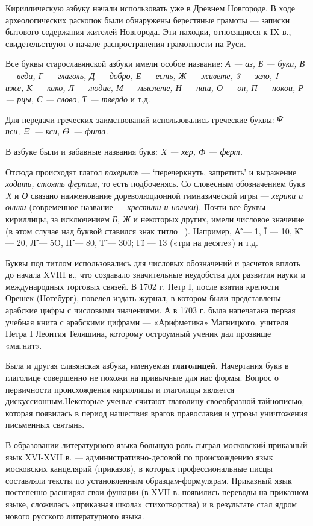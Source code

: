Кириллическую азбуку начали использовать уже в Древнем Новгороде.
В ходе археологических раскопок были обнаружены берестяные грамоты --- записки бытового содержания жителей Новгорода.
Эти находки, относящиеся к IX в., свидетельствуют о начале распространения грамотности на Руси.

Все буквы старославянской азбуки имели особое название: \textit{А --- аз, Б --- буки, В --- веди, Г --- глаголь, Д --- добро, Е --- есть, Ж --- живете, 3 --- зело, I --- иже, К --- како, Л --- людие, М --- мыслете, Н --- наш, О --- он, П --- покои, Р --- рцы, С --- слово, Т --- твердо} и т.д.

Для передачи греческих заимствований использовались греческие буквы: \textit{$\mit\Psi$ --- пси, $\mit\Xi$ --- кси, $\mit \Theta$ --- фита.}

В азбуке были и забавные названия букв: \textit{X --- хер, Ф --- ферт.}

Отсюда происходят глагол \textit{похерить} --- ‘перечеркнуть, запретить’ и выражение \textit{ходить, стоять фертом,} то есть подбоченясь.
Со словесным обозначением букв \textit{X} и \textit{О} связано наименование дореволюционной гимназической игры --- \textit{херики и оники} (современное название --- \textit{крестики и нолики}).
Почти все буквы кириллицы, за исключением \textit{Б, Ж} и некоторых других, имели числовое значение (в этом случае над буквой ставился знак титло ~). Например, \~{А} --- 1, \~{I} --- 10, \~{К} --- 20, \~{Л} --- 5O, \~{П} --- 80, \~{Т} --- 300; \~{ГI} --- 13 («три на десяте») и т.д.

Буквы под титлом использовались для числовых обозначений и расчетов вплоть до начала XVIII в., что создавало значительные неудобства для развития науки и международных торговых связей.
В 1702 г. Петр I, после взятия крепости Орешек (Нотебург), повелел издать журнал, в котором были представлены арабские цифры с числовыми значениями.
А в 1703 г. была напечатана первая учебная книга с арабскими цифрами --- «Арифметика» Магницкого, учителя Петра I Леонтия Теляшина, которому остроумный ученик дал прозвище «магнит».

Была и другая славянская азбука, именуемая \textbf{глаголицей.} Начертания букв в глаголице совершенно не похожи на привычные для нас формы.
Вопрос о первичности происхождения кириллицы и глаголицы является дискуссионным.Некоторые ученые считают глаголицу своеобразной тайнописью, которая появилась в период нашествия врагов православия и угрозы уничтожения письменных святынь.

В образовании литературного языка большую роль сыграл московский приказный язык XVI-XVII в. --- административно-деловой по происхождению язык московских канцелярий (приказов), в которых профессиональные писцы составляли тексты по установленным образцам-формулярам.
Приказный язык постепенно расширял свои функции (в XVII в. появились переводы на приказном языке, сложилась «приказная школа» стихотворства) и в результате стал ядром нового русского литературного языка.

